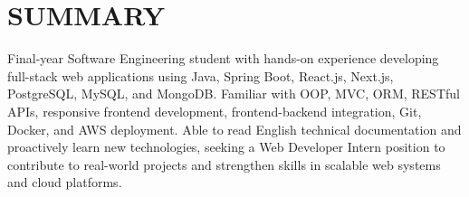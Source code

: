 \section{SUMMARY}
\noindent Final-year Software Engineering student with hands-on experience developing full-stack web applications using Java, Spring Boot, React.js, Next.js, PostgreSQL, MySQL, and MongoDB. Familiar with OOP, MVC, ORM, RESTful APIs, responsive frontend development, frontend-backend integration, Git, Docker, and AWS deployment. Able to read English technical documentation and proactively learn new technologies, seeking a Web Developer Intern position to contribute to real-world projects and strengthen skills in scalable web systems and cloud platforms.

